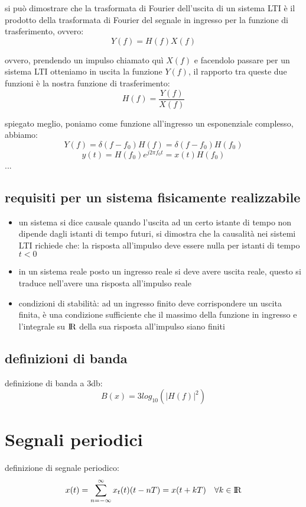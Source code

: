 \documentclass{article}
\begin{document}
si può dimostrare che la trasformata di Fourier dell'uscita di un sistema LTI è il prodotto della trasformata di Fourier del segnale in ingresso per la funzione di trasferimento, ovvero:
$$Y(f) = H(f)X(f)$$

ovvero, prendendo un impulso chiamato quì $X(f)$ e facendolo passare per un sistema LTI otteniamo in uscita la funzione $Y(f)$, il rapporto tra queste due funzioni è la nostra funzione di trasferimento:
$$H(f)=\frac{Y(f)}{X(f)}$$

spiegato meglio, poniamo come funzione all'ingresso un esponenziale complesso, abbiamo:
$$Y(f) = \delta(f - f_0) H(f) = \delta(f - f_0) H(f_0)$$
$$y(t)=H(f_0)e^{j2\pi f_0t}=x(t)H(f_0)$$
...

\subsection{requisiti per un sistema fisicamente realizzabile}
\begin{itemize}
\item un sistema si dice causale quando l'uscita ad un certo istante di tempo non dipende dagli istanti di tempo futuri, si dimostra che la causalità nei sistemi LTI richiede che:
la risposta all'impulso deve essere nulla per istanti di tempo $t < 0$

\item in un sistema reale posto un ingresso reale si deve avere uscita reale,
questo si traduce nell'avere una risposta all'impulso reale

\item condizioni di stabilità:
ad un ingresso finito deve corrispondere un uscita finita, è una condizione
sufficiente che il massimo della funzione in ingresso e l'integrale su $\rm I\!R$ della
sua risposta all'impulso siano finiti
\end{itemize}



\subsection{definizioni di banda}

definizione di banda a 3db:
$$B(x) = 3 log_{10}(|H(f)|^2)$$

\section{Segnali periodici}
definizione di segnale periodico:
$$x(t) = \sum\limits_{n=-\infty}^{\infty} x_t(t)(t-nT) = x(t+kT) \quad \forall k \in \rm I\!R$$
\end{document}
